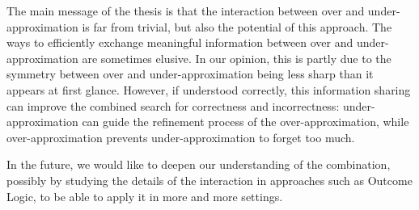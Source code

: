 The main message of the thesis is that the interaction between over and under-approximation is far from trivial, but also the potential of this approach. The ways to efficiently exchange meaningful information between over and under-approximation are sometimes elusive. In our opinion, this is partly due to the symmetry between over and under-approximation being less sharp than it appears at first glance. However, if understood correctly, this information sharing can improve the combined search for correctness and incorrectness: under-approximation can guide the refinement process of the over-approximation, while over-approximation prevents under-approximation to forget too much.

In the future, we would like to deepen our understanding of the combination, possibly by studying the details of the interaction in approaches such as Outcome Logic, to be able to apply it in more and more settings.
